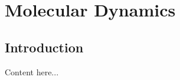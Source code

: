 \documentclass[../proposal]{subfiles}
\begin{document}
\chapter{Molecular Dynamics}

\section{Introduction}
Content here...
\end{document}
